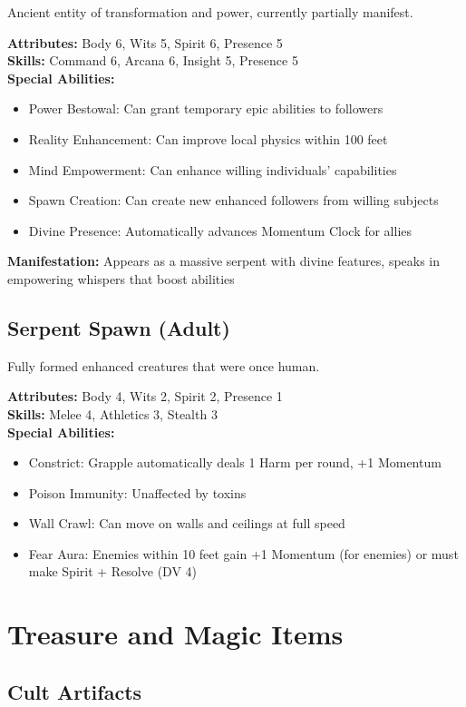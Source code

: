 \documentclass[12pt,twoside]{article}
\begin{document}
Ancient entity of transformation and power, currently partially manifest.

\textbf{Attributes:} Body 6, Wits 5, Spirit 6, Presence 5 \\
\textbf{Skills:} Command 6, Arcana 6, Insight 5, Presence 5 \\
\textbf{Special Abilities:}
\begin{itemize}
  \item Power Bestowal: Can grant temporary epic abilities to followers
  \item Reality Enhancement: Can improve local physics within 100 feet
  \item Mind Empowerment: Can enhance willing individuals' capabilities
  \item Spawn Creation: Can create new enhanced followers from willing subjects
  \item Divine Presence: Automatically advances Momentum Clock for allies
\end{itemize}
\textbf{Manifestation:} Appears as a massive serpent with divine features, speaks in empowering whispers that boost abilities

\subsection{Serpent Spawn (Adult)}

Fully formed enhanced creatures that were once human.

\textbf{Attributes:} Body 4, Wits 2, Spirit 2, Presence 1 \\
\textbf{Skills:} Melee 4, Athletics 3, Stealth 3 \\
\textbf{Special Abilities:}
\begin{itemize}
  \item Constrict: Grapple automatically deals 1 Harm per round, +1 Momentum
  \item Poison Immunity: Unaffected by toxins
  \item Wall Crawl: Can move on walls and ceilings at full speed
  \item Fear Aura: Enemies within 10 feet gain +1 Momentum (for enemies) or must make Spirit + Resolve (DV 4)
\end{itemize}

\section{Treasure and Magic Items}

\subsection{Cult Artifacts}
\end{document}
